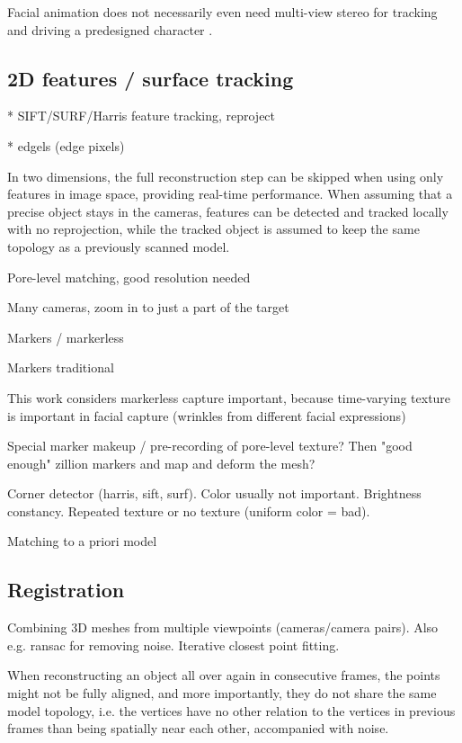 Facial animation does not necessarily even need multi-view stereo for tracking and driving a predesigned character \cite{chuang2002performance,deng2007computer}.


\subsection{2D features / surface tracking} %

* SIFT/SURF/Harris feature tracking, reproject

* edgels (edge pixels)

In two dimensions, the full reconstruction step can be skipped when using only features in image space, providing real-time performance. \cite{pilet2005real}
When assuming that a precise object stays in the cameras, features can be detected and tracked locally with no reprojection, while the tracked object is assumed to keep the same topology as a previously scanned model.

Pore-level matching, good resolution needed

Many cameras, zoom in to just a part of the target

Markers / markerless

Markers traditional


This work considers markerless capture important, because time-varying texture is important in facial capture (wrinkles from different facial expressions)

Special marker makeup / pre-recording of pore-level texture? Then "good enough" zillion markers and map and deform the mesh?

Corner detector (harris, sift, surf). Color usually not important. Brightness constancy. Repeated texture or no texture (uniform color = bad).

Matching to a priori model


\subsection{Registration} %

Combining 3D meshes from multiple viewpoints (cameras/camera pairs). Also e.g. ransac for removing noise. Iterative closest point fitting.


When reconstructing an object all over again in consecutive frames, the points might not be fully aligned, and more importantly, they do not share the same model topology, i.e. the vertices have no other relation to the vertices in previous frames than being spatially near each other, accompanied with noise. \cite{zhao2005alignment}

